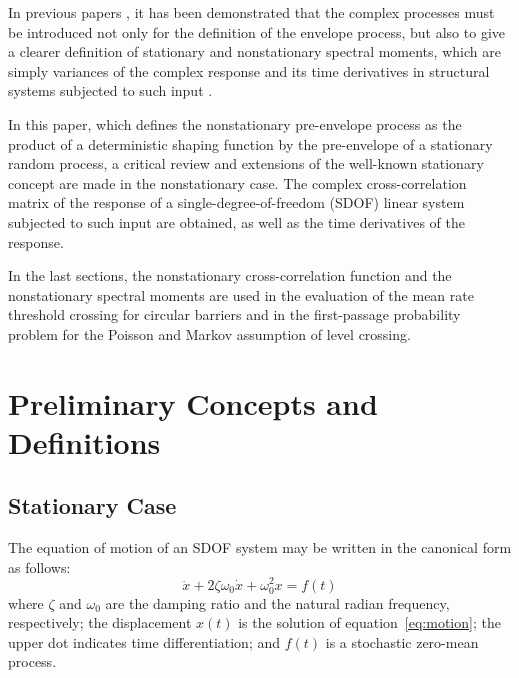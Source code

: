 \documentclass[11pt]{article}
\begin{document}
In previous papers \cite{borino1988,dipaola1985}, it has been demonstrated that the complex processes must be introduced not only for the definition of the envelope process, but also to give a clearer definition of stationary and nonstationary spectral moments, which are simply variances of the complex response and its time derivatives in structural systems subjected to such input \cite{dipaola1985}.

In this paper, which defines the nonstationary pre-envelope process as the product of a deterministic shaping function by the pre-envelope of a stationary random process, a critical review and extensions of the well-known stationary concept are made in the nonstationary case. The complex cross-correlation matrix of the response of a single-degree-of-freedom (SDOF) linear system subjected to such input are obtained, as well as the time derivatives of the response.

In the last sections, the nonstationary cross-correlation function and the nonstationary spectral moments are used in the evaluation of the mean rate threshold crossing for circular barriers and in the first-passage probability problem for the Poisson and Markov assumption of level crossing.

\section{Preliminary Concepts and Definitions}
\label{sec:preliminaries}

\subsection{Stationary Case}
\label{sec:stationary}

The equation of motion of an SDOF system may be written in the canonical form as follows:
\begin{equation}
\ddot{x} + 2\zeta\omega_0\dot{x} + \omega_0^2 x = f(t)
\label{eq:motion}
\end{equation}
where $\zeta$ and $\omega_0$ are the damping ratio and the natural radian frequency, respectively; the displacement $x(t)$ is the solution of equation~\eqref{eq:motion}; the upper dot indicates time differentiation; and $f(t)$ is a stochastic zero-mean process.
\end{document}
